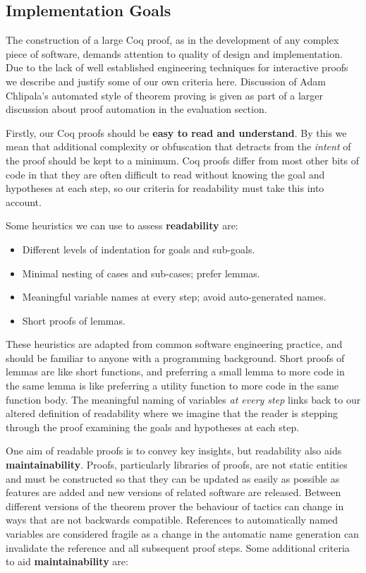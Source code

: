 \documentclass[]{unswthesis}
\let\i\textit
\let\b\textbf
\begin{document}
\subsection{Implementation Goals}
\label{sec:impl-goals}

The construction of a large Coq proof, as in the development of any complex piece of software, demands attention to quality of design and implementation. Due to the lack of well established engineering techniques for interactive proofs we describe and justify some of our own criteria here. Discussion of Adam Chlipala's automated style of theorem proving is given as part of a larger discussion about proof automation in the evaluation section.

Firstly, our Coq proofs should be \b{easy to read and understand}. By this we mean that additional complexity or obfuscation that detracts from the \i{intent} of the proof should be kept to a minimum. Coq proofs differ from most other bits of code in that they are often difficult to read without knowing the goal and hypotheses at each step, so our criteria for readability must take this into account.

Some heuristics we can use to assess \b{readability} are:

\begin{itemize}
\item Different levels of indentation for goals and sub-goals.
\item Minimal nesting of cases and sub-cases; prefer lemmas.
\item Meaningful variable names at every step; avoid auto-generated names.
\item Short proofs of lemmas.
\end{itemize}

These heuristics are adapted from common software engineering practice, and should be familiar to anyone with a programming background. Short proofs of lemmas are like short functions, and preferring a small lemma to more code in the same lemma is like preferring a utility function to more code in the same function body. The meaningful naming of variables \i{at every step} links back to our altered definition of readability where we imagine that the reader is stepping through the proof examining the goals and hypotheses at each step.

One aim of readable proofs is to convey key insights, but readability also aids \b{maintainability}. Proofs, particularly libraries of proofs, are not static entities and must be constructed so that they can be updated as easily as possible as features are added and new versions of related software are released. Between different versions of the theorem prover the behaviour of tactics can change in ways that are not backwards compatible. References to automatically named variables are considered fragile as a change in the automatic name generation can invalidate the reference and all subsequent proof steps. Some additional criteria to aid \b{maintainability} are:
\end{document}
